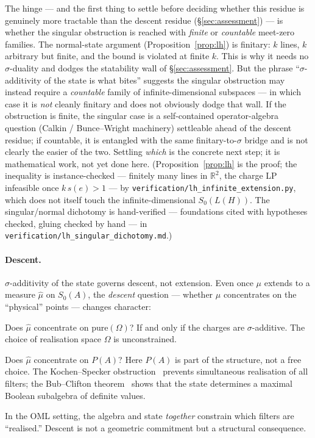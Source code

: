 \documentclass[11pt]{article}
\theoremstyle{definition}
\newcommand{\pure}{\mathrm{pure}}
\begin{document}
The hinge --- and the first thing to settle before deciding whether this
residue is genuinely more tractable than the descent residue
(\S\ref{sec:assessment}) --- is whether the singular obstruction is
reached with \emph{finite} or \emph{countable} meet-zero families.  The
normal-state argument (Proposition~\ref{prop:lh}) is finitary: $k$ lines,
$k$ arbitrary but finite, and the bound is violated at finite $k$.  This
is why it needs no $\sigma$-duality and dodges the statability wall of
\S\ref{sec:assessment}.  But the phrase ``$\sigma$-additivity of the
state is what bites'' suggests the singular obstruction may instead
require a \emph{countable} family of infinite-dimensional subspaces ---
in which case it is \emph{not} cleanly finitary and does not obviously
dodge that wall.  If the obstruction is finite, the singular case is a
self-contained operator-algebra question (Calkin / Bunce--Wright machinery)
settleable ahead of the descent residue; if countable, it is entangled
with the same finitary-to-$\sigma$ bridge and is not clearly the easier
of the two.  Settling \emph{which} is the concrete next step; it is
mathematical work, not yet done here.  (Proposition~\ref{prop:lh} is the proof; the inequality is
instance-checked --- finitely many lines in $\mathbb{R}^2$, the charge
LP infeasible once $k\,s(e) > 1$ --- by
\texttt{verification/lh\_infinite\_extension.py}, which does not itself
touch the infinite-dimensional $S_0(L(H))$.  The singular/normal
dichotomy is hand-verified --- foundations cited with hypotheses
checked, gluing checked by hand --- in
\texttt{verification/lh\_singular\_dichotomy.md}.)

\paragraph{Descent.}
$\sigma$-additivity of the state governs descent, not extension.
Even once $\mu$ extends to a measure $\hat\mu$ on $S_0(A)$, the
\emph{descent} question --- whether $\hat\mu$ concentrates on the
``physical'' points --- changes character:
\begin{description}[style=nextline, font=\normalfont\bfseries,
    labelwidth=2.5cm, leftmargin=3cm]
  \item[Boolean]
    Does $\hat\mu$ concentrate on $\pure(\Omega)$?  If and only if
    the charges are $\sigma$-additive.  The choice of realisation
    space $\Omega$ is unconstrained.
  \item[OML]
    Does $\hat\mu$ concentrate on $P(A)$?  Here $P(A)$ is part of
    the structure, not a free choice.  The Kochen--Specker
    obstruction~\cite{KochenSpecker1967} prevents simultaneous
    realisation of all filters; the Bub--Clifton
    theorem~\cite{BubClifton1996} shows that the state determines
    a maximal Boolean subalgebra of definite values.
\end{description}
In the OML setting, the algebra and state \emph{together}
constrain which filters are ``realised.''  Descent is not a
geometric commitment but a structural consequence.
\end{document}
